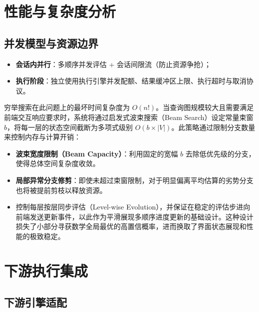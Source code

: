 \documentclass[12pt,a4paper]{article}
\begin{document}
\section{性能与复杂度分析}
\subsection{并发模型与资源边界}

\begin{itemize}
  \item \textbf{会话内并行}：多顺序并发评估 + 会话间限流（防止资源争抢）；
  \item \textbf{执行阶段}：独立使用执行引擎并发配额、结果缓冲区上限、执行超时与取消协议。
\end{itemize}

穷举搜索在此问题上的最坏时间复杂度为 $O(n!)$。当查询图规模较大且需要满足前端交互响应要求时，系统将通过启发式波束搜索（Beam Search）设定常量束窗 $b$，将每一层的状态空间截断为多项式级别 $O(b \times |V|)$。此策略通过限制分支数量来控制内存与计算开销：
\begin{itemize}
  \item \textbf{波束宽度限制（Beam Capacity）}：利用固定的宽幅 $b$ 去除低优先级的分支，使得总体空间复杂度收敛。
  \item \textbf{局部异常分支修剪}：即使未超过束窗限制，对于明显偏离平均估算的劣势分支也将被提前剪枝以释放资源。
  \item 控制每层按层同步评估（Level-wise Evolution），并保证在稳定的评估步进向前端发送更新事件，以此作为平滑展现多顺序进度更新的基础设计。这种设计损失了小部分寻获数学全局最优的高置信概率，进而换取了界面状态展现和性能的极致稳定。
\end{itemize}

\section{下游执行集成}
\subsection{下游引擎适配}
\end{document}
